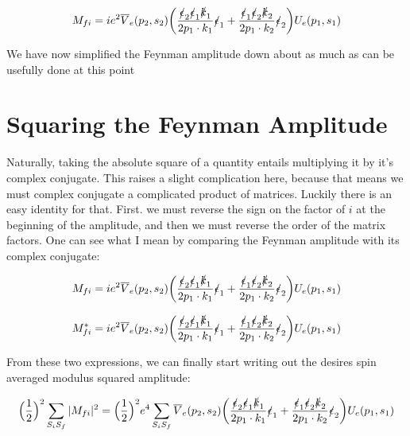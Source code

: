 \documentclass[a4]{article}
\begin{document}
    \begin{equation}
        M_{fi} = i e^2 \overline{V}_e (p_2, s_2) \bigg( \frac{\slashed{\epsilon}_2 \slashed{\epsilon}_1 \slashed{k}_1}{2 p_1 \cdot k_1} \slashed{\epsilon}_1  + \frac{\slashed{\epsilon}_1 \slashed{\epsilon}_2 \slashed{k}_2}{2 p_1 \cdot k_2} \slashed{\epsilon}_2 \bigg) U_e (p_1, s_1)
    \end{equation}

    We have now simplified the Feynman amplitude down about as much as can be usefully done at this point

    \section*{Squaring the Feynman Amplitude}

    Naturally, taking the absolute square of a quantity entails multiplying it by it's complex conjugate. This raises a slight complication here,  because that means we must complex conjugate a complicated product of matrices. Luckily there is an easy
    identity for that. First. we must reverse the sign on the factor of $i$ at the beginning of the amplitude, and then we must reverse the order of the matrix factors. One can see what I mean by comparing the Feynman amplitude with its complex conjugate:

    \begin{equation}
        M_{fi} = i e^2 \overline{V}_e (p_2, s_2) \bigg( \frac{\slashed{\epsilon}_2 \slashed{\epsilon}_1 \slashed{k}_1}{2 p_1 \cdot k_1} \slashed{\epsilon}_1  + \frac{\slashed{\epsilon}_1 \slashed{\epsilon}_2 \slashed{k}_2}{2 p_1 \cdot k_2} \slashed{\epsilon}_2 \bigg) U_e (p_1, s_1)
    \end{equation}

    \begin{equation}
        M_{fi}^* = i e^2 \overline{V}_e (p_2, s_2) \bigg( \frac{\slashed{\epsilon}_2 \slashed{\epsilon}_1 \slashed{k}_1}{2 p_1 \cdot k_1} \slashed{\epsilon}_1  + \frac{\slashed{\epsilon}_1 \slashed{\epsilon}_2 \slashed{k}_2}{2 p_1 \cdot k_2} \slashed{\epsilon}_2 \bigg) U_e (p_1, s_1)
    \end{equation}

    From these two expressions, we can finally start writing out the desires spin averaged modulus squared amplitude:

    \begin{equation}
        \Big( \frac{1}{2} \Big)^2 \sum_{S_i S_f} |M_{fi}|^2 = \Big( \frac{1}{2} \Big)^2 e^4 \sum_{S_i S_f} \overline{V}_e (p_2, s_2) \bigg( \frac{\slashed{\epsilon}_2 \slashed{\epsilon}_1 \slashed{k}_1}{2 p_1 \cdot k_1} \slashed{\epsilon}_1  + \frac{\slashed{\epsilon}_1 \slashed{\epsilon}_2 \slashed{k}_2}{2 p_1 \cdot k_2} \slashed{\epsilon}_2 \bigg) U_e (p_1, s_1)
    \end{equation}
\end{document}
